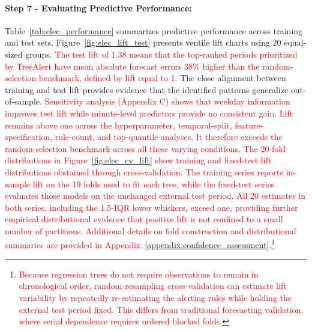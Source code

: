 \documentclass[12pt]{article}
\newcommand{\matt}[1]{\textcolor{red}{#1}}
\begin{document}
\paragraph{Step 7 - Evaluating Predictive Performance:}

Table~\ref{tab:elec_performance} summarizes predictive performance across training and test sets. Figure~\ref{fig:elec_lift_test} presents ventile lift charts using 20 equal-sized groups. \matt{The test lift of 1.38 means that the top-ranked periods prioritized by TreeAlert have mean absolute forecast errors 38\% higher than the random-selection benchmark, defined by lift equal to 1.} The close alignment between training and test lift provides evidence that the identified patterns generalize out-of-sample. \matt{Sensitivity analysis (Appendix C) shows that weekday information improves test lift while minute-level predictors provide no consistent gain. Lift remains above one across the hyperparameter, temporal-split, feature-specification, rule-count, and top-quantile analyses. It therefore exceeds the random-selection benchmark across all these varying conditions.}
\matt{The 20-fold distributions in Figure~\ref{fig:elec_cv_lift} show training and fixed-test lift distributions obstained through cross-validation. The training series reports in-sample lift on the 19 folds used to fit each tree, while the fixed-test series evaluates those models on the unchanged external test period. All 20 estimates in both series, including the 1.5-IQR lower whiskers, exceed one, providing further empirical distributional evidence that positive lift is not confined to a small number of partitions. Additional details on fold construction and distributional summaries are provided in Appendix~\ref{appendix:confidence_assessment}.}\footnote{\matt{Because regression trees do not require observations to remain in chronological order, random-resampling cross-validation can estimate lift variability by repeatedly re-estimating the alerting rules while holding the external test period fixed. This differs from traditional forecasting validation, where serial dependence requires ordered blocked folds.}}

\end{document}
